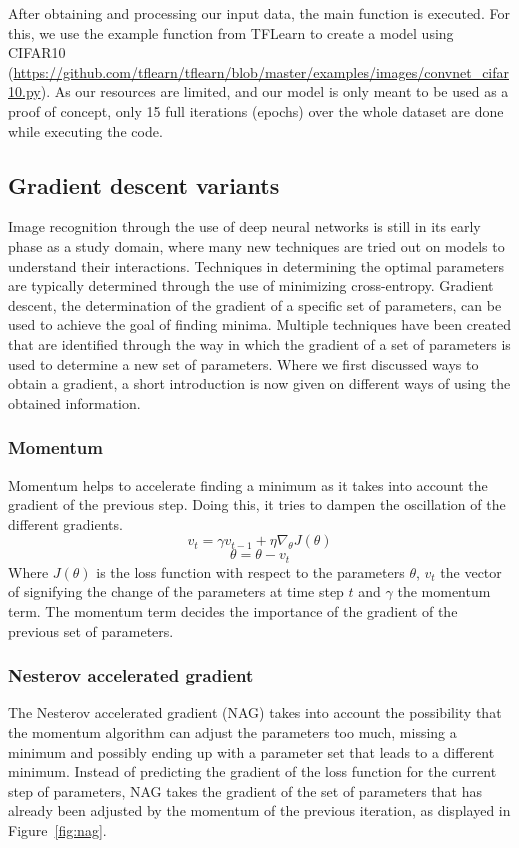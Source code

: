 After obtaining and processing our input data, the main function is executed. For this, we use the example function from TFLearn to create a model using CIFAR10 (\url{https://github.com/tflearn/tflearn/blob/master/examples/images/convnet_cifar10.py}). As our resources are limited, and our model is only meant to be used as a proof of concept, only 15 full iterations (epochs) over the whole dataset are done while executing the code.
\subsection{Gradient descent variants \label{subsec:gradient}}
Image recognition through the use of deep neural networks is still in its early phase as a study domain, where many new techniques are tried out on models to understand their interactions. Techniques in determining the optimal parameters are typically determined through the use of minimizing cross-entropy. Gradient descent, the determination of the gradient of  a specific set of parameters, can be used to achieve the goal of finding minima. Multiple techniques have been created that are identified through the way in which the gradient of a set of parameters is used to determine a new set of parameters. Where we first discussed ways to obtain a gradient, a short introduction is now given on different ways of using the obtained information.
\subsubsection{Momentum \label{subsubsec:momentum}}
Momentum helps to accelerate finding a minimum as it takes into account the gradient of the previous step. Doing this, it tries to dampen the oscillation of the different gradients. 
$$v_t = \gamma v_{t-1} + \eta \nabla_\theta J( \theta)$$
$$ \theta = \theta - v_t $$
Where $J( \theta)$ is the loss function with respect to the parameters $\theta$, $v_t$ the vector of signifying the change of the parameters at time step $t$ and  $\gamma$ the momentum term. The momentum term decides the importance of the gradient of the previous set of parameters.
\subsubsection{Nesterov accelerated gradient \label{subsubsec:nesterov}}
The Nesterov accelerated gradient (NAG) takes into account the possibility that the momentum algorithm can adjust the parameters too much, missing a minimum and possibly ending up with a parameter set that leads to a different minimum. Instead of predicting the gradient of the loss function for the current step of parameters, NAG takes the gradient of the set of parameters that has already been adjusted by the momentum of the previous iteration, as displayed in Figure~\ref{fig:nag}.

